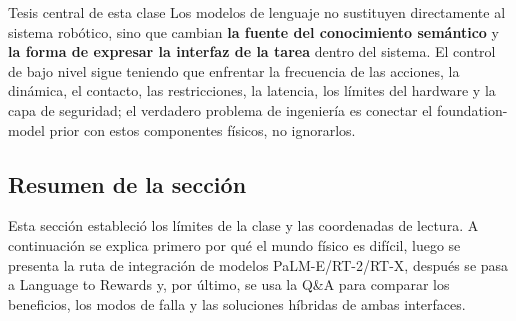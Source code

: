 
\begin{importantbox}{Tesis central de esta clase}
Los modelos de lenguaje no sustituyen directamente al sistema robótico, sino que cambian \textbf{la fuente del conocimiento semántico} y \textbf{la forma de expresar la interfaz de la tarea} dentro del sistema. El control de bajo nivel sigue teniendo que enfrentar la frecuencia de las acciones, la dinámica, el contacto, las restricciones, la latencia, los límites del hardware y la capa de seguridad; el verdadero problema de ingeniería es conectar el foundation-model prior con estos componentes físicos, no ignorarlos.
\end{importantbox}

\subsection{Resumen de la sección}

Esta sección estableció los límites de la clase y las coordenadas de lectura. A continuación se explica primero por qué el mundo físico es difícil, luego se presenta la ruta de integración de modelos PaLM-E/RT-2/RT-X, después se pasa a Language to Rewards y, por último, se usa la Q\&A para comparar los beneficios, los modos de falla y las soluciones híbridas de ambas interfaces.
